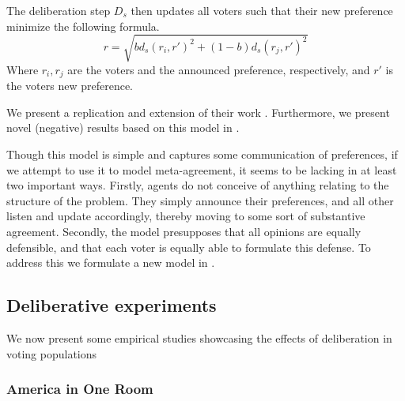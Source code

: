 The deliberation step $D_s$ then updates all voters such that their new preference  minimize the following formula.
\begin{equation}
	r =
	\sqrt{
		b d_s(r_i, r')^2 + (1-b)d_s(r_j, r')^2
	}
	\label{eq:deliberation_step_formula}
\end{equation}
Where $r_i, r_j$ are the voters and the announced preference, respectively, and $r'$ is the voters new preference.

We present a replication and extension of their work . Furthermore, we present novel (negative) results based on this model in .

Though this model is simple and captures some communication of preferences, if we attempt to use it to model meta-agreement, it seems to be lacking in at least two important ways. Firstly, agents do not conceive of anything relating to the structure of the problem. They simply announce their preferences, and all other listen and update accordingly, thereby moving to some sort of substantive agreement. Secondly, the model presupposes that all opinions are equally defensible, and that each voter is equally able to formulate this defense. To address this we formulate a new model in .


\subsection{Deliberative experiments}

We now present some empirical studies showcasing the effects of deliberation in voting populations

\subsubsection{America in One Room}




